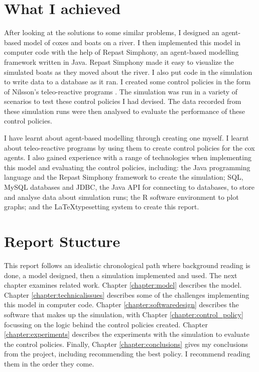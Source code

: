   \section{What I achieved}
  After looking at the solutions to some similar problems, I designed an agent-based model of coxes and boats on a river. I then implemented this model in computer code with the help of Repast Simphony, an agent-based modelling framework written in Java. Repast Simphony made it easy to visualize the simulated boats as they moved about the river. I also put code in the simulation to write data to a database as it ran. I created some control policies in the form of Nilsson's teleo-reactive programs \cite{Nilsson1994}. The simulation was run in a variety of scenarios to test these control policies I had devised. The data recorded from these simulation runs were then analysed to evaluate the performance of these control policies.
  
  I have learnt about agent-based modelling through creating one myself. I learnt about teleo-reactive programs by using them to create control policies for the cox agents. I also gained experience with a range of technologies when implementing this model and evaluating the control policies, including: the Java programming language and the Repast Simphony framework to create the simulation; SQL, MySQL databases and JDBC, the Java API for connecting to databases, to store and analyse data about simulation runs; the R software environment to plot graphs; and the \LaTeX typesetting system to create this report.
  
  \section{Report Stucture}
  This report follows an idealistic chronological path where background reading is done, a model designed, then a simulation implemented and used. The next chapter examines related work. Chapter \ref{chapter:model} describes the model. Chapter \ref{chapter:technicalissues} describes some of the challenges implementing this model in computer code. Chapter \ref{chapter:softwaredesign} describes the software that makes up the simulation, with Chapter \ref{chapter:control_policy} focussing on the logic behind the control policies created. Chapter \ref{chapter:experiments} describes the experiments with the simulation to evaluate the control policies. Finally, Chapter \ref{chapter:conclusions} gives my conclusions from the project, including recommending the best policy. I recommend reading them in the order they come.
